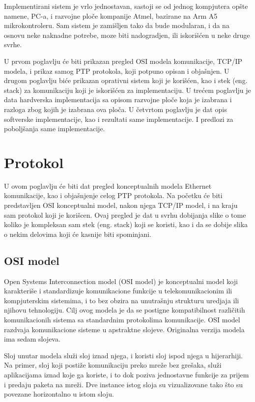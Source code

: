 \documentclass[a4paper,12pt, master]{etf}
\begin{document}
	Implementirani sistem je vrlo jednostavan, sastoji se od jednog kompjutera
	op\v{s}te namene, PC-a, i razvojne plo\v{c}e kompanije Atmel, bazirane na
	Arm A5 mikrokontroleru. Sam sistem je zami\v{s}ljen tako da bude modularan,
	i da na osnovu neke naknadne potrebe, moze biti nadogradjen, ili
	iskori\v{s}\'{c}en u neke druge svrhe.

	U prvom poglavlju \'{c}e biti prikazan pregled OSI modela komunikacije,
	TCP/IP modela, i prikaz samog PTP protokola, koji potpuno opisan i
	obja\v{s}njen. U drugom poglavlju bi\'{c}e prikazan oprativni sistem koji
	je kori\v{s}\'{c}en, kao i stek (eng\@. stack) za komunikaciju koji je
	iskori\v{s}\'{c}en za implementaciju. U tre\'{c}em poglavlju je data
	hardverska implementacija sa opisom razvojne plo\v{c}e koja je izabrana i
	razloga zbog kojih je izabrana ova plo\v{c}a. U \v{c}etvrtom poglavlju je
	dat opis softverske implementacije, kao i rezultati same implementacije. I
	predlozi za pobolj\v{s}anja same implementacije.

	\newpage

	\chapter{Protokol}

	U ovom poglavlju \'{c}e biti dat pregled konceptualnih modela Ethernet
	komunikacije, kao i obja\v{s}njenje	celog PTP protokola. Na po\v{c}etku
	\'{c}e biti predstavljen OSI konceptualni model, nakon njega TCP/IP	model,
	i na kraju sam protokol koji je kori\v{s}cen. Ovaj pregled je dat u svrhu
	dobijanja slike o tome koliko je kompleksan sam stek (eng\@. stack) koji se
    koristi, kao i da se dobije slika o nekim delovima koji \'{c}e kasnije biti
    spominjani.

	\section{OSI model}

	Open Systems Interconnection model (OSI model) je konceptualni model koji
	karakteri\v{s}e i standardizuje komunikacione funkcije u telekomunikacionim
	ili kompjuterskim sistemima, i to bez obzira na unutra\v{s}nju strukturu
	uredjaja ili njihovu tehnologiju. Cilj ovog modela je da se postigne
	kompatibilnost razli\v{c}itih komunikacionih sistema sa standardnim
	protokolima komunikacije. OSI model razdvaja komunikacione sisteme u
	apstraktne slojeve.	Originalna verzija modela ima sedam slojeva.

	Sloj unutar modela slu\v{z}i sloj iznad njega, i koristi sloj ispod njega u
	hijerarhiji. Na	primer, sloj koji posti\v{z}e komunikaciju preko mre\v{z}e
	bez gre\v{s}aka, slu\v{z}i aplikacijama iznad koje ga koriste, i to dok
	poziva jednostavne funkcije za prijem i predaju paketa na mre\v{z}i.
	Dve instance istog sloja su vizualizovane tako \v{s}to su povezane
	horizontalno u istom sloju.
\end{document}
